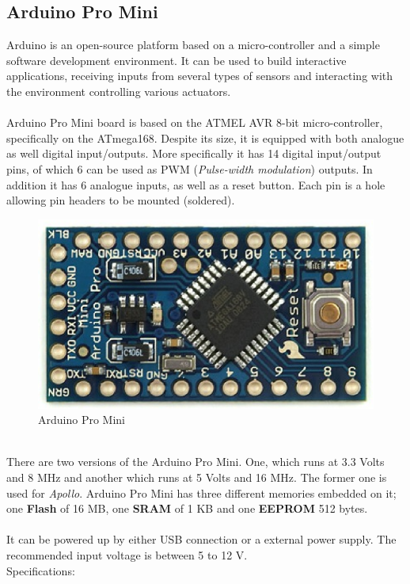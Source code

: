 \documentclass[12pt,a4paper]{report}
\begin{document}
\subsection{Arduino Pro Mini}
Arduino is an open-source platform based on a micro-controller and a simple software development environment. It can be used to build interactive applications, receiving inputs from several types of sensors and interacting with the environment controlling various actuators.\\
\ \\
Arduino Pro Mini board is based on the ATMEL AVR 8-bit micro-controller, specifically on the ATmega168. Despite its size, it is equipped with both analogue as well digital input/outputs. More specifically it has 14 digital input/output pins, of which 6 can be used as PWM (\textit{Pulse-width modulation}) outputs. In addition it has 6 analogue inputs, as well as a reset button. Each pin is a hole allowing pin headers to be mounted (soldered).\ \\
\begin{figure}[H]
\centering
\includegraphics*[scale=0.4]{arduinopromini}
\caption{Arduino Pro Mini} 
\end{figure}
\ \\
There are two versions of the Arduino Pro Mini. One, which runs at 3.3 Volts and 8 MHz and another which runs at 5 Volts and 16 MHz. The former one is used for \emph{Apollo}. Arduino Pro Mini has three different memories embedded on it; one \textbf{Flash} of 16 MB, one \textbf{SRAM} of 1 KB and one \textbf{EEPROM} 512 bytes.\\
\ \\
It can be powered up by either USB connection or a external power supply. The recommended input voltage is between 5 to 12 V.
\ \\
%
Specifications:
\end{document}

